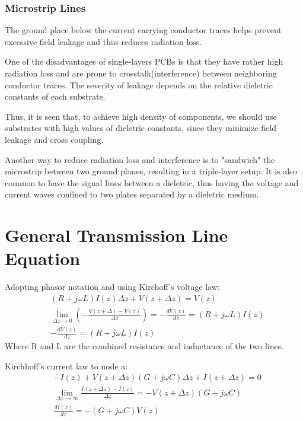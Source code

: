 \documentclass{article}
\begin{document}
\subsubsection{Microstrip Lines}
\vspace{5cm}
The ground place below the current carrying conductor traces helps prevent excessive field leakage and thus reduces radiation loss. 

\newpage
One of the disadvantages of single-layers PCBs is that they have rather high radiation loss and are prone to crosstalk(interference) between neighboring conductor traces. The severity of leakage depends on the relative dieletric constants of each substrate.


\vspace{5cm}
Thus, it is seen that, to achieve high density of components, we should use substrates with high values of dieletric constants, since they minimize field leakage and cross coupling.

Another way to reduce radiation loss and interference is to "sandwich" the microstrip between two ground planes, resulting in a triple-layer setup.
\vspace{5cm}
It is also common to have the signal lines between a dieletric, thus having the voltage and current waves confined to two plates separated by a dieletric medium.
\vspace{5cm}
\section{General Transmission Line Equation}
\vspace{5cm}
Adopting phasor notation and using Kirchoff's voltage law:
\begin{align*}
  &(R+j\omega L)I(z)\Delta z+V(z+\Delta z)=V(z)\\
  &\lim_{\Delta z \to 0} \left( -\frac{V(z+\Delta)-V(z)}{\Delta z}\right)= -\frac{dV(z)}{dz}=(R+j\omega L)I(z)\\
  &-\frac{dV(z)}{dz}=(R+j\omega L)I(z)
\end{align*}
Where R and L are the combined resistance and inductance of the two lines.

Kirchhoff's current law to node a:
\begin{align*}
  &-I(z)+V(z+\Delta z)(G+j\omega C)\Delta z+I(z+\Delta z)=0\\
  &\lim_{\Delta z \to \infty} \frac{I(z+\Delta z) - I(z)}{\Delta z}=-V(z+\Delta z)(G+j\omega C)\\
  &\frac{dI(z)}{dz}=-(G+j\omega C)V(z)\\
\end{align*}
\end{document}
